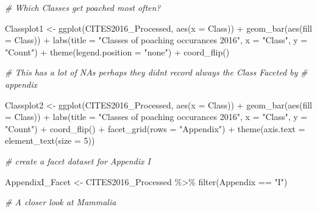 \documentclass[
  12pt,
]{article}
\newenvironment{Shaded}{\begin{snugshade}}{\end{snugshade}}
\newcommand{\AttributeTok}[1]{\textcolor[rgb]{0.77,0.63,0.00}{#1}}
\newcommand{\CommentTok}[1]{\textcolor[rgb]{0.56,0.35,0.01}{\textit{#1}}}
\newcommand{\DecValTok}[1]{\textcolor[rgb]{0.00,0.00,0.81}{#1}}
\newcommand{\FunctionTok}[1]{\textcolor[rgb]{0.00,0.00,0.00}{#1}}
\newcommand{\NormalTok}[1]{#1}
\newcommand{\OtherTok}[1]{\textcolor[rgb]{0.56,0.35,0.01}{#1}}
\newcommand{\SpecialCharTok}[1]{\textcolor[rgb]{0.00,0.00,0.00}{#1}}
\newcommand{\StringTok}[1]{\textcolor[rgb]{0.31,0.60,0.02}{#1}}
\begin{document}
\begin{Shaded}
\begin{Highlighting}[]
\CommentTok{\# Which Classes get poached most often?}

\NormalTok{Classplot1 }\OtherTok{\textless{}{-}} \FunctionTok{ggplot}\NormalTok{(CITES2016\_Processed, }\FunctionTok{aes}\NormalTok{(}\AttributeTok{x =}\NormalTok{ Class)) }\SpecialCharTok{+} \FunctionTok{geom\_bar}\NormalTok{(}\FunctionTok{aes}\NormalTok{(}\AttributeTok{fill =}\NormalTok{ Class)) }\SpecialCharTok{+}
    \FunctionTok{labs}\NormalTok{(}\AttributeTok{title =} \StringTok{"Classes of poaching occurances 2016"}\NormalTok{, }\AttributeTok{x =} \StringTok{"Class"}\NormalTok{, }\AttributeTok{y =} \StringTok{"Count"}\NormalTok{) }\SpecialCharTok{+}
    \FunctionTok{theme}\NormalTok{(}\AttributeTok{legend.position =} \StringTok{"none"}\NormalTok{) }\SpecialCharTok{+} \FunctionTok{coord\_flip}\NormalTok{()}



\CommentTok{\# This has a lot of NAs perhaps they didn\textquotesingle{}t record always the Class Faceted by}
\CommentTok{\# appendix}

\NormalTok{Classplot2 }\OtherTok{\textless{}{-}} \FunctionTok{ggplot}\NormalTok{(CITES2016\_Processed, }\FunctionTok{aes}\NormalTok{(}\AttributeTok{x =}\NormalTok{ Class)) }\SpecialCharTok{+} \FunctionTok{geom\_bar}\NormalTok{(}\FunctionTok{aes}\NormalTok{(}\AttributeTok{fill =}\NormalTok{ Class)) }\SpecialCharTok{+}
    \FunctionTok{labs}\NormalTok{(}\AttributeTok{title =} \StringTok{"Classes of poaching occurances 2016"}\NormalTok{, }\AttributeTok{x =} \StringTok{"Class"}\NormalTok{, }\AttributeTok{y =} \StringTok{"Count"}\NormalTok{) }\SpecialCharTok{+}
    \FunctionTok{coord\_flip}\NormalTok{() }\SpecialCharTok{+} \FunctionTok{facet\_grid}\NormalTok{(}\AttributeTok{rows =} \StringTok{"Appendix"}\NormalTok{) }\SpecialCharTok{+} \FunctionTok{theme}\NormalTok{(}\AttributeTok{axis.text =} \FunctionTok{element\_text}\NormalTok{(}\AttributeTok{size =} \DecValTok{5}\NormalTok{))}

\CommentTok{\# create a facet dataset for Appendix I}

\NormalTok{AppendixI\_Facet }\OtherTok{\textless{}{-}}\NormalTok{ CITES2016\_Processed }\SpecialCharTok{\%\textgreater{}\%}
    \FunctionTok{filter}\NormalTok{(Appendix }\SpecialCharTok{==} \StringTok{"I"}\NormalTok{)}


\CommentTok{\# A closer look at Mammalia}


\end{Highlighting}
\end{Shaded}
\end{document}
